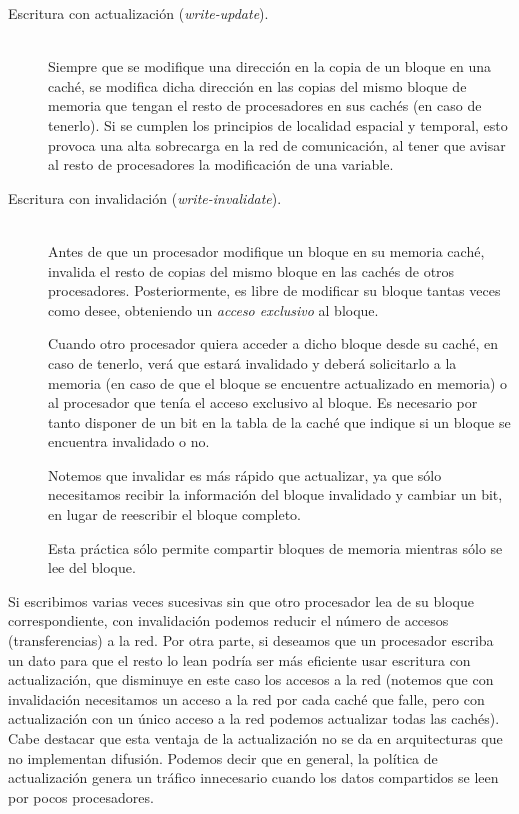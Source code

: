 \begin{description}
    \item [Escritura con actualización (\emph{write-update}).]~\\
        Siempre que se modifique una dirección en la copia de un bloque en una caché, se modifica dicha dirección en las copias del mismo bloque de memoria que tengan el resto de procesadores en sus cachés (en caso de tenerlo). Si se cumplen los principios de localidad espacial y temporal, esto provoca una alta sobrecarga en la red de comunicación, al tener que avisar al resto de procesadores la modificación de una variable.
    \item [Escritura con invalidación (\emph{write-invalidate}).]~\\ 
        Antes de que un procesador modifique un bloque en su memoria caché, invalida el resto de copias del mismo bloque en las cachés de otros procesadores. Posteriormente, es libre de modificar su bloque tantas veces como desee, obteniendo un \emph{acceso exclusivo} al bloque. 

        Cuando otro procesador quiera acceder a dicho bloque desde su caché, en caso de tenerlo, verá que estará invalidado y deberá solicitarlo a la memoria (en caso de que el bloque se encuentre actualizado en memoria) o al procesador que tenía el acceso exclusivo al bloque. Es necesario por tanto disponer de un bit en la tabla de la caché que indique si un bloque se encuentra invalidado o no.

        Notemos que invalidar es más rápido que actualizar, ya que sólo necesitamos recibir la información del bloque invalidado y cambiar un bit, en lugar de reescribir el bloque completo. 

        Esta práctica sólo permite compartir bloques de memoria mientras sólo se lee del bloque.
\end{description}
Si escribimos varias veces sucesivas sin que otro procesador lea de su bloque correspondiente, con invalidación podemos reducir el número de accesos (transferencias) a la red. Por otra parte, si deseamos que un procesador escriba un dato para que el resto lo lean podría ser más eficiente usar escritura con actualización, que disminuye en este caso los accesos a la red (notemos que con invalidación necesitamos un acceso a la red por cada caché que falle, pero con actualización con un único acceso a la red podemos actualizar todas las cachés). Cabe destacar que esta ventaja de la actualización no se da en arquitecturas que no implementan difusión. Podemos decir que en general, la política de actualización genera un tráfico innecesario cuando los datos compartidos se leen por pocos procesadores.\\

